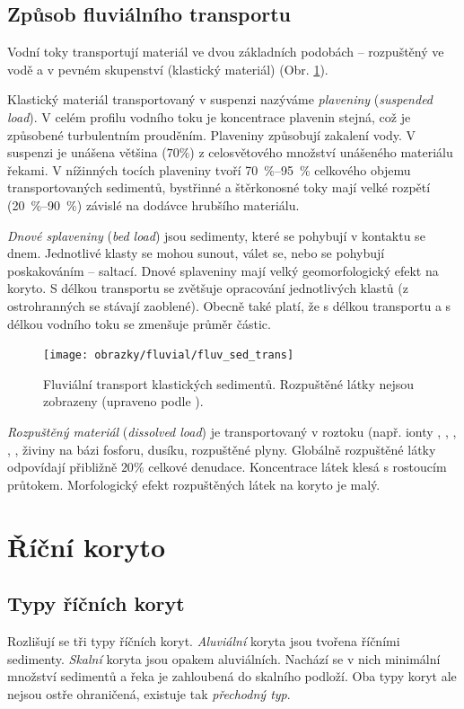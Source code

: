 \subsection{Způsob fluviálního transportu}
Vodní toky transportují materiál ve dvou základních podobách -- rozpuštěný ve vodě a v pevném skupenství (klastický materiál) (Obr. \ref{fig:fluvsedtrans}). 

Klastický materiál transportovaný v suspenzi nazýváme \emph{plaveniny} (\textit{suspended load}).  V celém profilu vodního toku je koncentrace plavenin stejná, což je způsobené turbulentním prouděním. Plaveniny způsobují zakalení vody. V suspenzi je unášena většina ($70 \%$) z celosvětového množství unášeného materiálu řekami. V nížinných tocích plaveniny tvoří \SIrange{70}{95}{\percent} celkového objemu transportovaných sedimentů, bystřinné a štěrkonosné toky mají velké rozpětí (\SIrange{20}{90}{\percent}) závislé na dodávce hrubšího materiálu. 

\emph{Dnové splaveniny} (\textit{bed load}) jsou sedimenty, které se pohybují v kontaktu se dnem. Jednotlivé klasty se mohou sunout, válet se, nebo se pohybují poskakováním -- saltací. Dnové splaveniny mají velký geomorfologický efekt na koryto. S délkou transportu se zvětšuje opracování jednotlivých klastů (z ostrohranných se stávají zaoblené). Obecně také platí, že s délkou transportu a s délkou vodního toku se zmenšuje průměr částic.

\begin{figure}
	\centering
	\texttt{[image: obrazky/fluvial/fluv\_sed\_trans]}
	\caption{Fluviální transport klastických sedimentů. Rozpuštěné látky nejsou zobrazeny (upraveno podle \textcite{charltonFundamentalsFluvialGeomorphology2007}).}
	\label{fig:fluvsedtrans}
\end{figure}

\emph{Rozpuštěný materiál} (\textit{dissolved load}) je transportovaný v roztoku (např. ionty , , , , , živiny na bázi fosforu, dusíku, rozpuštěné plyny. Globálně rozpuštěné látky odpovídají přibližně $20 \%$ celkové denudace. Koncentrace látek klesá s rostoucím průtokem. Morfologický efekt rozpuštěných látek na koryto je malý. 


\section{Říční koryto}
\subsection{Typy říčních koryt}
Rozlišují se tři typy říčních koryt. \emph{Aluviální} koryta jsou tvořena říčními sedimenty. \emph{Skalní} koryta jsou opakem aluviálních. Nachází se v nich minimální množství sedimentů a řeka je zahloubená do skalního podloží. Oba typy koryt ale nejsou ostře ohraničená, existuje tak \emph{přechodný typ}. 

